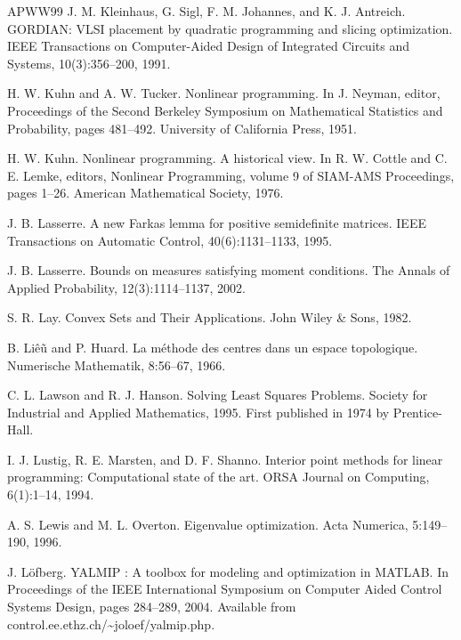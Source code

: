 \begin{thebibliography}{APWW99}
 J. M. Kleinhaus, G. Sigl, F. M. Johannes, and K. J. Antreich. GORDIAN: VLSI placement by quadratic programming and slicing optimization. IEEE Transactions on Computer-Aided Design of Integrated Circuits and Systems, 10(3):356–200, 1991.

 H. W. Kuhn and A. W. Tucker. Nonlinear programming. In J. Neyman, editor, Proceedings of the Second Berkeley Symposium on Mathematical Statistics and Probability, pages 481–492. University of California Press, 1951.

 H. W. Kuhn. Nonlinear programming. A historical view. In R. W. Cottle and C. E. Lemke, editors, Nonlinear Programming, volume 9 of SIAM-AMS Proceedings, pages 1–26. American Mathematical Society, 1976.

 J. B. Lasserre. A new Farkas lemma for positive semidefinite matrices. IEEE Transactions on Automatic Control, 40(6):1131–1133, 1995.

 J. B. Lasserre. Bounds on measures satisfying moment conditions. The Annals of Applied Probability, 12(3):1114–1137, 2002.

 S. R. Lay. Convex Sets and Their Applications. John Wiley \& Sons, 1982.

 B. Liêũ and P. Huard. La méthode des centres dans un espace topologique. Numerische Mathematik, 8:56–67, 1966.

 C. L. Lawson and R. J. Hanson. Solving Least Squares Problems. Society for Industrial and Applied Mathematics, 1995. First published in 1974 by Prentice-Hall.

 I. J. Lustig, R. E. Marsten, and D. F. Shanno. Interior point methods for linear programming: Computational state of the art. ORSA Journal on Computing, 6(1):1–14, 1994.

 A. S. Lewis and M. L. Overton. Eigenvalue optimization. Acta Numerica, 5:149–190, 1996.

 J. Löfberg. YALMIP : A toolbox for modeling and optimization in MATLAB. In Proceedings of the IEEE International Symposium on Computer Aided Control Systems Design, pages 284–289, 2004. Available from control.ee.ethz.ch/\textasciitilde{}joloef/yalmip.php.


\end{thebibliography}
